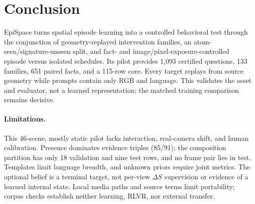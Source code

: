 \section{Conclusion}
\label{sec:conclusion}

EpiSpace turns spatial episode learning into a controlled behavioral test through the
conjunction of geometry-replayed intervention families, an
atom-seen/signature-unseen split, and fact- and image/pixel-exposure-controlled
episode versus isolated schedules.  Its pilot provides 1,093 certified
questions, 133 families, 651 paired facts, and a 115-row core.  Every target
replays from source geometry while prompts contain only RGB and language.  This
validates the asset and evaluator, not a learned representation; the matched
training comparison remains decisive.

\paragraph{Limitations.}
This 46-scene, mostly static pilot lacks interaction, real-camera shift, and
human calibration.  Presence dominates evidence triples (85/91); the
composition partition has only 18 validation and nine test rows, and no frame
pair lies in test.  Templates limit language breadth, and unknown priors require
joint metrics.  The optional belief is a terminal target, not per-view
$\Delta S$ supervision or evidence of a learned internal state.  Local media
paths and source terms limit portability; corpus checks establish neither
learning, RLVR, nor external transfer.
